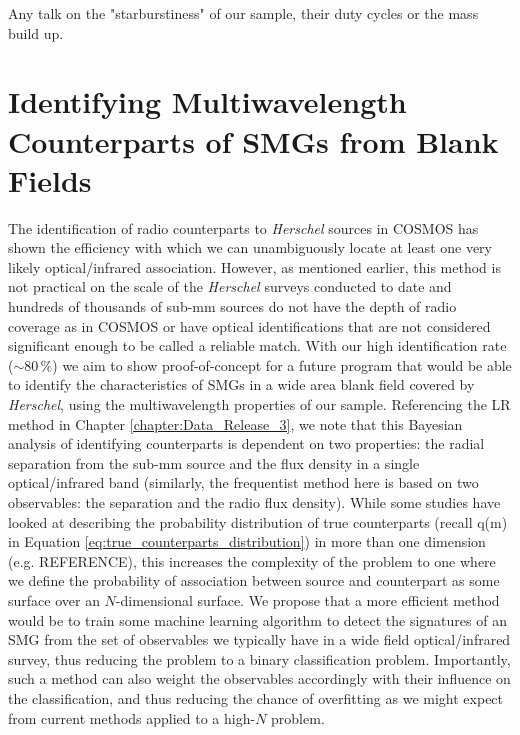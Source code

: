 {\color{red}Any talk on the "starburstiness" of our sample, their duty cycles or the mass build up.}

\section{Identifying Multiwavelength Counterparts of SMGs from Blank Fields}

The identification of radio counterparts to \textit{Herschel} sources in COSMOS has shown the efficiency with which we can unambiguously locate at least one very likely optical/infrared association. However, as mentioned earlier, this method is not practical on the scale of the \textit{Herschel} surveys conducted to date and hundreds of thousands of sub-mm sources do not have the depth of radio coverage as in COSMOS or have optical identifications that are not considered significant enough to be called a reliable match. With our high identification rate ($\sim 80\,\%$) we aim to show proof-of-concept for a future program that would be able to identify the characteristics of SMGs in a wide area blank field covered by \textit{Herschel}, using the multiwavelength properties of our sample. Referencing the LR method in Chapter \ref{chapter:Data_Release_3}, we note that this Bayesian analysis of identifying counterparts is dependent on two properties: the radial separation from the sub-mm source and the flux density in a single optical/infrared band (similarly, the frequentist method here is based on two observables: the separation and the radio flux density). While some studies have looked at describing the probability distribution of true counterparts (recall q(m) in Equation \ref{eq:true_counterparts_distribution}) in more than one dimension (e.g. {\color{red}REFERENCE}), this increases the complexity of the problem to one where we define the probability of association between source and counterpart as some surface over an $N$-dimensional surface. We propose that a more efficient method would be to train some machine learning algorithm to detect the signatures of an SMG from the set of observables we typically have in a wide field optical/infrared survey, thus reducing the problem to a binary classification problem. Importantly, such a method can also weight the observables accordingly with their influence on the classification, and thus reducing the chance of overfitting as we might expect from current methods applied to a high-$N$ problem.

